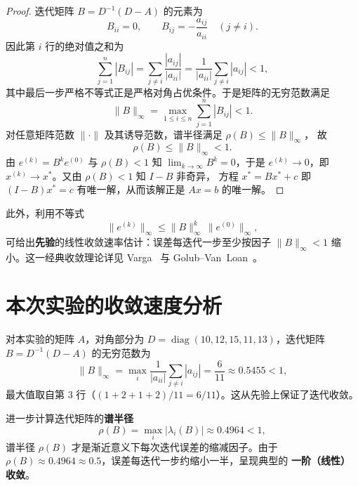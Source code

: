 \documentclass[12pt,a4paper]{ctexart}
\begin{document}
\begin{proof}
  迭代矩阵 $B = D^{-1}(D-A)$ 的元素为
  \begin{equation}
    B_{ii} = 0,\qquad
    B_{ij} = -\frac{a_{ij}}{a_{ii}}\quad (j\neq i).
  \end{equation}
  因此第 $i$ 行的绝对值之和为
  \begin{equation}
    \sum_{j=1}^{n} |B_{ij}|
    = \sum_{j\neq i} \frac{|a_{ij}|}{|a_{ii}|}
    = \frac{1}{|a_{ii}|}\sum_{j\neq i} |a_{ij}| < 1,
  \end{equation}
  其中最后一步严格不等式正是严格对角占优条件。于是矩阵的无穷范数满足
  \begin{equation}
    \|B\|_{\infty}
    = \max_{1\le i\le n}\sum_{j=1}^{n}|B_{ij}| < 1.
  \end{equation}
  对任意矩阵范数 $\|\cdot\|$ 及其诱导范数，谱半径满足 $\rho(B) \le \|B\|_{\infty}$，
  故
  \begin{equation}
    \rho(B) \le \|B\|_{\infty} < 1.
  \end{equation}
  由 $e^{(k)} = B^{k}e^{(0)}$ 与 $\rho(B)<1$ 知 $\lim_{k\to\infty}B^{k}=0$，于是
  $e^{(k)}\to 0$，即 $x^{(k)}\to x^{\ast}$。又由 $\rho(B)<1$ 知 $I-B$ 非奇异，
  方程 $x^{\ast}=B x^{\ast}+c$ 即 $(I-B)x^{\ast}=c$ 有唯一解，从而该解正是
  $Ax=b$ 的唯一解。\qedhere
\end{proof}

此外，利用不等式
\begin{equation}
  \|e^{(k)}\|_{\infty} \le \|B\|_{\infty}^{k}\,\|e^{(0)}\|_{\infty},
\end{equation}
可给出\textbf{先验}的线性收敛速率估计：误差每迭代一步至少按因子
$\|B\|_{\infty}<1$ 缩小。这一经典收敛理论详见 Varga~\cite{varga2000} 与
Golub--Van~Loan~\cite{golub2013}。

\section{本次实验的收敛速度分析}

对本实验的矩阵 $A$，对角部分为
$D=\operatorname{diag}(10,12,15,11,13)$，迭代矩阵 $B = D^{-1}(D-A)$ 的无穷范数为
\begin{equation}
  \|B\|_{\infty} = \max_{i}\frac{1}{|a_{ii}|}\sum_{j\neq i}|a_{ij}| = \frac{6}{11} \approx 0.5455 < 1,
\end{equation}
最大值取自第 $3$ 行（$(1+2+1+2)/11 = 6/11$）。这从先验上保证了迭代收敛。

进一步计算迭代矩阵的\textbf{谱半径}
\begin{equation}
  \rho(B) = \max_{i}|\lambda_i(B)| \approx 0.4964 < 1,
\end{equation}
谱半径 $\rho(B)$ 才是渐近意义下每次迭代误差的缩减因子。由于
$\rho(B) \approx 0.4964 \approx 0.5$，误差每迭代一步约缩小一半，呈现典型的
\textbf{一阶（线性）收敛}。
\end{document}
